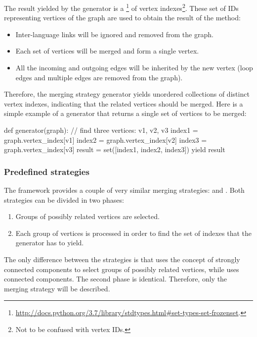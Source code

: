                 The result yielded by the generator is a \footnote{\url{http://docs.python.org/3.7/library/stdtypes.html\#set-types-set-frozenset}.} of vertex indexes\footnote{Not to be confused with vertex IDs.}. These set of IDs representing vertices of the graph are used to obtain the result of the  method:
                \begin{itemize}
                    \item Inter-language links will be ignored and removed from the graph.
                    \item Each set of vertices will be merged and form a single vertex.
                    \item All the incoming and outgoing edges will be inherited by the new vertex (loop edges and multiple edges are removed from the graph).
                \end{itemize}
                Therefore, the merging strategy generator yields unordered collections of distinct vertex indexes, indicating that the related vertices should be merged. Here is a simple example of a generator that returns a single set of vertices to be merged:
                \begin{example}
def generator(graph):
    // find three vertices: v1, v2, v3
    index1 = graph.vertex_index[v1]
    index2 = graph.vertex_index[v2]
    index3 = graph.vertex_index[v3]
    result = set([index1, index2, index3])
    yield result
                \end{example}
            \subsubsection{Predefined strategies}\label{predefined_strategies}
                The framework provides a couple of very similar merging strategies:  and . Both strategies can be divided in two phases:
                \begin{enumerate}
                    \item Groups of possibly related vertices are selected.
                    \item Each group of vertices is processed in order to find the set of indexes that the generator has to yield.
                \end{enumerate}
                The only difference between the strategies is that  uses the concept of strongly connected components to select groups of possibly related vertices, while  uses connected components. The second phase is identical. Therefore, only the  merging strategy will be described.
                
